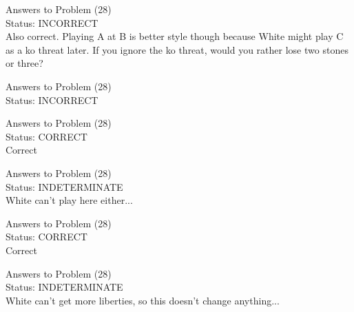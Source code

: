 \documentclass[11pt]{article}
\begin{document}
\begin{minipage}[t]{0.5\textwidth}
  {\centering
  
  Answers to Problem (28)\\
  Status: INCORRECT\\
  Also correct. Playing A at B is better style though because White might play C as a ko threat later. If you ignore the ko threat, would you rather lose two stones or three?\\
  }
\end{minipage}
\begin{minipage}[t]{0.5\textwidth}
  {\centering
  
  Answers to Problem (28)\\
  Status: INCORRECT\\
  
  }
\end{minipage}
\begin{minipage}[t]{0.5\textwidth}
  {\centering
  
  Answers to Problem (28)\\
  Status: CORRECT\\
  Correct\\
  }
\end{minipage}
\begin{minipage}[t]{0.5\textwidth}
  {\centering
  
  Answers to Problem (28)\\
  Status: INDETERMINATE\\
  White can't play here either...\\
  }
\end{minipage}
\begin{minipage}[t]{0.5\textwidth}
  {\centering
  
  Answers to Problem (28)\\
  Status: CORRECT\\
  Correct\\
  }
\end{minipage}
\begin{minipage}[t]{0.5\textwidth}
  {\centering
  
  Answers to Problem (28)\\
  Status: INDETERMINATE\\
  White can't get more liberties, so this doesn't change anything...\\
  }
\end{minipage}
\end{document}
